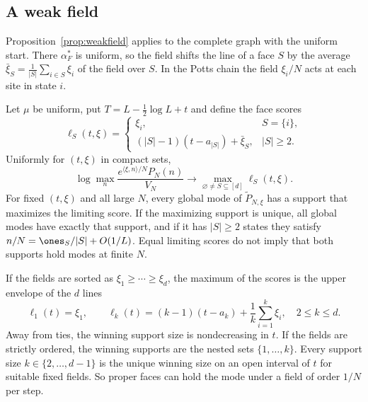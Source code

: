 \subsection{A weak field}\label{sec:complete-field}

Proposition~\ref{prop:weakfield} applies to the complete graph with the uniform start. There
$\alpha^*_F$ is uniform, so the field shifts the line of a face $S$ by the average
$\bar\xi_S=\frac1{|S|}\sum_{i\in S}\xi_i$ of the field over $S$. In the Potts chain the
field $\xi_i/N$ acts at each site in state $i$.

\begin{corollary}\label{cor:weakfield-phases}
Let $\mu$ be uniform, put $T=L-\frac12\log L+t$ and define the face scores
\[
 \ell_S(t,\xi)=
 \begin{cases}
 \xi_i,& S=\{i\},\\
 (|S|-1)(t-a_{|S|})+\bar\xi_S,& |S|\ge2.
 \end{cases}
\]
Uniformly for $(t,\xi)$ in compact sets,
\begin{equation}\label{eq:weakfield-maximum}
 \log\max_n\frac{e^{\langle\xi,n\rangle/N}P_N(n)}{V_N}
 \longrightarrow \max_{\varnothing\ne S\subseteq[d]}\ell_S(t,\xi).
\end{equation}
For fixed $(t,\xi)$ and all large $N$, every global mode of $\widetilde P_{N,\xi}$ has a support that
maximizes the limiting score. If the maximizing support is unique, all global modes have exactly
that support, and if it has $|S|\ge2$ states they satisfy $n/N=\ones_S/|S|+O(1/L)$. Equal
limiting scores do not imply that both supports hold modes at finite $N$.

If the fields are sorted as $\xi_1\ge\cdots\ge\xi_d$, the maximum of the scores is
the upper envelope of the $d$ lines
\begin{equation}\label{eq:weakfield-lines}
 \ell_1(t)=\xi_1,\qquad
 \ell_k(t)=(k-1)(t-a_k)+\frac1k\sum_{i=1}^k\xi_i,
 \quad 2\le k\le d.
\end{equation}
Away from ties, the winning support size is nondecreasing in $t$. If the fields are strictly
ordered, the winning supports are the nested sets $\{1,\ldots,k\}$. Every support size
$k\in\{2,\ldots,d-1\}$ is the unique winning size on an open interval of $t$ for suitable fixed
fields. So proper faces can hold the mode under a field of order $1/N$ per step.
\end{corollary}

